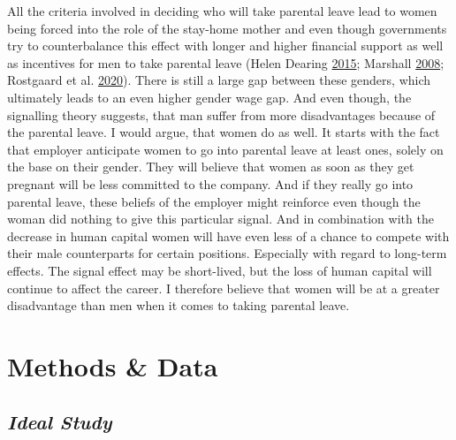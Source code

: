 \documentclass[
  12pt,
]{article}
\begin{document}
All the criteria involved in deciding who will take parental leave lead to women being forced into the role of the stay-home mother and even though governments try to counterbalance this effect with longer and higher financial support as well as incentives for men to take parental leave (Helen Dearing \protect\hyperlink{ref-helen_dearing_does_2015}{2015}; Marshall \protect\hyperlink{ref-marshall_fathers_2008}{2008}; Rostgaard et al. \protect\hyperlink{ref-rostgaard_parental_2020}{2020}). There is still a large gap between these genders, which ultimately leads to an even higher gender wage gap. And even though, the signalling theory suggests, that man suffer from more disadvantages because of the parental leave. I would argue, that women do as well. It starts with the fact that employer anticipate women to go into parental leave at least ones, solely on the base on their gender. They will believe that women as soon as they get pregnant will be less committed to the company. And if they really go into parental leave, these beliefs of the employer might reinforce even though the woman did nothing to give this particular signal. And in combination with the decrease in human capital women will have even less of a chance to compete with their male counterparts for certain positions. Especially with regard to long-term effects. The signal effect may be short-lived, but the loss of human capital will continue to affect the career. I therefore believe that women will be at a greater disadvantage than men when it comes to taking parental leave.

\hypertarget{methods-data}{%
\section{Methods \& Data}\label{methods-data}}

\hypertarget{ideal-study}{%
\subsection*{\texorpdfstring{\emph{Ideal Study}}{Ideal Study}}\label{ideal-study}}
\end{document}
